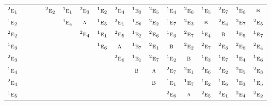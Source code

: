 \documentclass[10pt,a4paper]{article}
\numberwithin{equation}{section}
\newcommand{\irr}[1]{\text{\normalfont\scshape #1}}
\newcommand{\conjpair}[1]{{}^{#1}}
\begin{document}
{\begin{longtable}{@{}lcccccccccccccccc@{}}
$\conjpair{2}\irr{e}_{1}$ &  &  &  & $\conjpair{2}\irr{e}_{2}$ & $\conjpair{1}\irr{e}_{1}$ & $\conjpair{2}\irr{e}_{3}$ & $\conjpair{1}\irr{e}_{2}$ & $\conjpair{2}\irr{e}_{4}$ & $\conjpair{1}\irr{e}_{3}$ & $\conjpair{2}\irr{e}_{5}$ & $\conjpair{1}\irr{e}_{4}$ & $\conjpair{2}\irr{e}_{6}$ & $\conjpair{1}\irr{e}_{5}$ & $\conjpair{2}\irr{e}_{7}$ & $\conjpair{1}\irr{e}_{6}$ & $\irr{b}$\\
$\conjpair{1}\irr{e}_{2}$ &  &  &  &  & $\conjpair{1}\irr{e}_{4}$ & $\irr{a}$ & $\conjpair{1}\irr{e}_{5}$ & $\conjpair{2}\irr{e}_{1}$ & $\conjpair{1}\irr{e}_{6}$ & $\conjpair{2}\irr{e}_{2}$ & $\conjpair{1}\irr{e}_{7}$ & $\conjpair{2}\irr{e}_{3}$ & $\irr{b}$ & $\conjpair{2}\irr{e}_{4}$ & $\conjpair{2}\irr{e}_{7}$ & $\conjpair{2}\irr{e}_{5}$\\
$\conjpair{2}\irr{e}_{2}$ &  &  &  &  &  & $\conjpair{2}\irr{e}_{4}$ & $\conjpair{1}\irr{e}_{1}$ & $\conjpair{2}\irr{e}_{5}$ & $\conjpair{1}\irr{e}_{2}$ & $\conjpair{2}\irr{e}_{6}$ & $\conjpair{1}\irr{e}_{3}$ & $\conjpair{2}\irr{e}_{7}$ & $\conjpair{1}\irr{e}_{4}$ & $\irr{b}$ & $\conjpair{1}\irr{e}_{5}$ & $\conjpair{1}\irr{e}_{7}$\\
$\conjpair{1}\irr{e}_{3}$ &  &  &  &  &  &  & $\conjpair{1}\irr{e}_{6}$ & $\irr{a}$ & $\conjpair{1}\irr{e}_{7}$ & $\conjpair{2}\irr{e}_{1}$ & $\irr{b}$ & $\conjpair{2}\irr{e}_{2}$ & $\conjpair{2}\irr{e}_{7}$ & $\conjpair{2}\irr{e}_{3}$ & $\conjpair{2}\irr{e}_{6}$ & $\conjpair{2}\irr{e}_{4}$\\
$\conjpair{2}\irr{e}_{3}$ &  &  &  &  &  &  &  & $\conjpair{2}\irr{e}_{6}$ & $\conjpair{1}\irr{e}_{1}$ & $\conjpair{2}\irr{e}_{7}$ & $\conjpair{1}\irr{e}_{2}$ & $\irr{b}$ & $\conjpair{1}\irr{e}_{3}$ & $\conjpair{1}\irr{e}_{7}$ & $\conjpair{1}\irr{e}_{4}$ & $\conjpair{1}\irr{e}_{6}$\\
$\conjpair{1}\irr{e}_{4}$ &  &  &  &  &  &  &  &  & $\irr{b}$ & $\irr{a}$ & $\conjpair{2}\irr{e}_{7}$ & $\conjpair{2}\irr{e}_{1}$ & $\conjpair{2}\irr{e}_{6}$ & $\conjpair{2}\irr{e}_{2}$ & $\conjpair{2}\irr{e}_{5}$ & $\conjpair{2}\irr{e}_{3}$\\
$\conjpair{2}\irr{e}_{4}$ &  &  &  &  &  &  &  &  &  & $\irr{b}$ & $\conjpair{1}\irr{e}_{1}$ & $\conjpair{1}\irr{e}_{7}$ & $\conjpair{1}\irr{e}_{2}$ & $\conjpair{1}\irr{e}_{6}$ & $\conjpair{1}\irr{e}_{3}$ & $\conjpair{1}\irr{e}_{5}$\\
$\conjpair{1}\irr{e}_{5}$ &  &  &  &  &  &  &  &  &  &  & $\conjpair{2}\irr{e}_{6}$ & $\irr{a}$ & $\conjpair{2}\irr{e}_{5}$ & $\conjpair{2}\irr{e}_{1}$ & $\conjpair{2}\irr{e}_{4}$ & $\conjpair{2}\irr{e}_{2}$\\

\end{longtable}}
\end{document}

